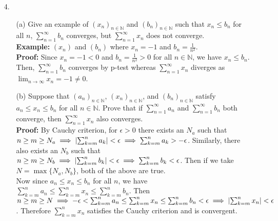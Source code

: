 \documentclass{article}
\begin{document}
\newpage
\begin{itemize}
    \item [4.] \begin{itemize}
              \item [(a)] Give an example of $(x_n)_{n\in\mathbb{N}}$ and $(b_n)_{n\in\mathbb{N}}$ such that $x_n\leq b_n$ for all $n$, $\sum_{n=1}^\infty b_n$ converges, but $\sum_{n=1}^\infty x_n$ does not converge.\\\textbf{Example: } $(x_n)$ and $(b_n)$ where $x_n=-1$ and $b_n=\frac{1}{n^2}$.\\\textbf{Proof: } Since $x_n=-1<0$ and $b_n=\frac{1}{n^2}>0$ for all $n\in\mathbb{N}$, we have $x_n\leq b_n$. Then, $\sum_{n=1}^\infty b_n$ converges by p-test whereas $\sum_{n=1}^\infty x_n$ diverges as $\lim_{n\to\infty}x_n=-1\neq 0$.
              \item [(b)] Suppose that $(a_n)_{n\in\mathbb{N}}$, $(x_n)_{n\in\mathbb{N}}$, and $(b_n)_{n\in\mathbb{N}}$ satisfy $a_n\leq x_n\leq b_n$ for all $n\in\mathbb{N}$. Prove that if $\sum_{n=1}^\infty a_n$ and $\sum_{n=1}^\infty b_n$ both converge, then $\sum_{n=1}^\infty x_n$ also converges.\\\textbf{Proof: } By Cauchy criterion, for $\epsilon>0$ there exists an $N_a$ such that $n\geq m\geq N_a\implies \abs{\sum_{k=m}^n a_k}<\epsilon\implies\sum_{k=m}^n a_k>-\epsilon$. Similarly, there also exists an $N_b$ such that $n\geq m\geq N_b\implies \abs{\sum_{k=m}^n b_k}<\epsilon\implies\sum_{k=m}^n b_k<\epsilon$. Then if we take $N=\max\{N_a,N_b\}$, both of the above are true.\\
                    Now since $a_n\leq x_n\leq b_n$ for all $n$, we have $\sum_{k=m}^na_n\leq \sum_{k=m}^nx_n\leq \sum_{k=m}^nb_n$. Then $n\geq m\geq N\implies-\epsilon<\sum_{k=m}^na_n\leq \sum_{k=m}^nx_n\leq \sum_{k=m}^nb_n<\epsilon\implies\abs{\sum_{k=m}^nx_n}<\epsilon$. Therefore $\sum_{k=m}^nx_n$ satisfies the Cauchy criterion and is convergent.
          \end{itemize}
\end{itemize}
\end{document}
